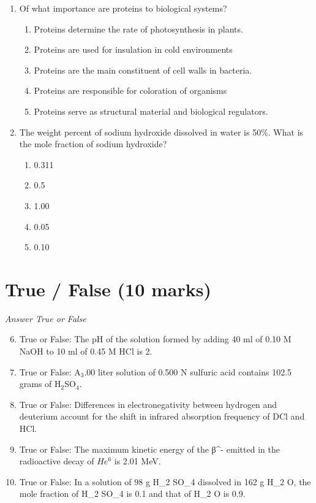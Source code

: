 \documentclass[12pt]{article}
\begin{document}
\begin{enumerate}[label=\arabic*.]
\begin{enumerate}[label=(\alph*)]
    \item 2.26 \ensuremath{\times} 10^\{-2\} $\mathrm{~m}^3 \mathrm{~mol}^{-1}$
\end{enumerate}
\item Of what importance are proteins to biological systems?
\begin{enumerate}[label=(\alph*)]
    \item Proteins determine the rate of photosynthesis in plants.
    \item Proteins are used for insulation in cold environments
    \item Proteins are the main constituent of cell walls in bacteria.
    \item Proteins are responsible for coloration of organisms
    \item Proteins serve as structural material and biological regulators.
\end{enumerate}
\item The weight percent of sodium hydroxide dissolved in water is 50\%. What is the mole fraction of sodium hydroxide?
\begin{enumerate}[label=(\alph*)]
    \item 0.311
    \item 0.5
    \item 1.00
    \item 0.05
    \item 0.10
\end{enumerate}
\end{enumerate}

\section*{True / False (10 marks)}
\textit{Answer True or False}
\begin{enumerate}[label=\arabic*.]
\setcounter{enumi}{5}
\item True or False: The pH of the solution formed by adding 40 ml of 0.10 M NaOH to 10 ml of 0.45 M HCl is 2.
\item True or False: A$_{3}$.00 liter solution of 0.500 N sulfuric acid contains 102.5 grams of H$_{2}$SO$_{4}$.
\item True or False: Differences in electronegativity between hydrogen and deuterium account for the shift in infrared absorption frequency of DCl and HCl.
\item True or False: The maximum kinetic energy of the β^- emitted in the radioactive decay of $He^6$ is 2.01 MeV.
\item True or False: In a solution of 98 g H\_2 SO\_4 dissolved in 162 g H\_2 O, the mole fraction of H\_2 SO\_4 is 0.1 and that of H\_2 O is 0.9.
\end{enumerate}
\end{document}
